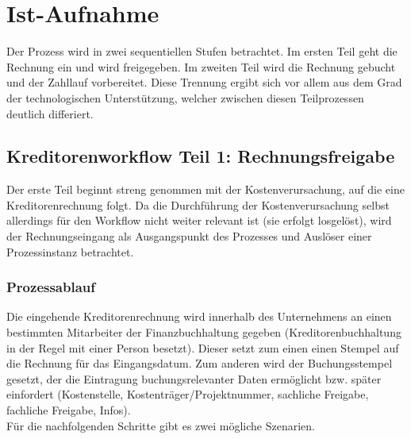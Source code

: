 \section{Ist-Aufnahme}
Der Prozess wird in zwei sequentiellen Stufen betrachtet. 
Im ersten Teil geht die Rechnung  ein und wird freigegeben.
Im zweiten Teil wird die Rechnung gebucht und der Zahllauf vorbereitet.
Diese Trennung ergibt sich vor allem aus dem Grad der technologischen Unterstützung, welcher zwischen diesen Teilprozessen deutlich differiert.
\subsection{Kreditorenworkflow Teil 1: Rechnungsfreigabe}
Der erste Teil beginnt streng genommen mit der Kostenverursachung, auf die eine Kreditorenrechnung folgt. 
Da die Durchführung der Kostenverursachung selbst allerdings für den Workflow nicht weiter relevant ist (sie erfolgt losgelöst), wird der Rechnungseingang als Ausgangspunkt des Prozesses und Auslöser einer Prozessinstanz betrachtet. 
\subsubsection{Prozessablauf}
Die eingehende Kreditorenrechnung wird innerhalb des Unternehmens an einen bestimmten Mitarbeiter der Finanzbuchhaltung gegeben (Kreditorenbuchhaltung in der Regel mit einer Person besetzt).
Dieser setzt zum einen einen Stempel auf die Rechnung für das Eingangsdatum.
Zum anderen wird der Buchungsstempel gesetzt, der die Eintragung buchungsrelevanter Daten ermöglicht bzw. später einfordert (Kostenstelle, Kostenträger/Projektnummer, sachliche Freigabe, fachliche Freigabe, Infos).\\
Für die nachfolgenden Schritte gibt es zwei mögliche Szenarien.

